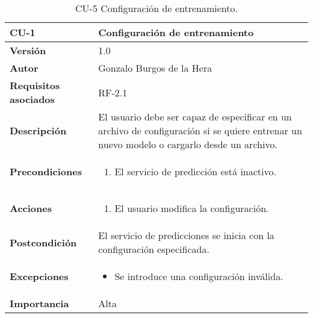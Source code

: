 \begin{table}[H]
	\centering
	\begin{tabularx}{\linewidth}{ p{} p{} }
		\toprule
		\textbf{CU-1}    & \textbf{Configuración de entrenamiento}\\
		\toprule
		\textbf{Versión}              & 1.0    \\
		\textbf{Autor}                & Gonzalo Burgos de la Hera \\
		\textbf{Requisitos asociados} & RF-2.1 \\
		\textbf{Descripción}          & El usuario debe ser capaz de especificar en un archivo de configuración si se quiere entrenar un nuevo modelo o cargarlo desde un archivo. \\
		\textbf{Precondiciones}       & 
        \begin{enumerate}
			\def\labelenumi{\arabic{enumi}.}
			\tightlist
			\item El servicio de predicción está inactivo.
		\end{enumerate}\\
		\textbf{Acciones}             &
		\begin{enumerate}
			\def\labelenumi{\arabic{enumi}.}
			\tightlist
			\item El usuario modifica la configuración.
		\end{enumerate}\\
		\textbf{Postcondición}        & El servicio de predicciones se inicia con la configuración especificada. \\
		\textbf{Excepciones}          & 
        \begin{itemize}
			\tightlist
			\item Se introduce una configuración inválida.
        \end{itemize} \\
		\textbf{Importancia}          & Alta \\
		\bottomrule
	\end{tabularx}
	\caption{CU-5 Configuración de entrenamiento.}
\end{table}

